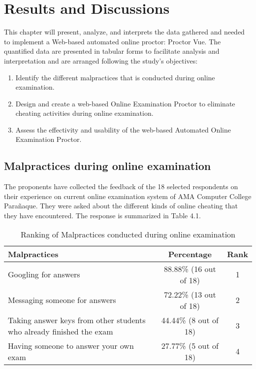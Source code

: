 \chapter{Results and Discussions}

This chapter will present, analyze, and interprets the data gathered and needed to implement a Web-based automated online proctor: Proctor Vue.
The quantified data are presented in tabular forms to facilitate analysis and interpretation and are arranged following the study’s objectives:

\begin{enumerate}
   \item Identify the different malpractices that is conducted during online examination.
   \item Design and create a web-based Online Examination Proctor to eliminate cheating activities during online examination.
   \item Assess the effectivity and usability of the web-based Automated Online Examination Proctor.
\end{enumerate}

\section{Malpractices during online examination}

The proponents have collected the feedback of the 18 selected respondents on their experience on current online examination system of AMA Computer College Parañaque.
They were asked about the different kinds of online cheating that they have encountered.
The response is summarized in Table 4.1.

\pagebreak

\begin{table}[h!]
   \begin{center}
      \begin{tabular}{|m{20em}|c|c|}
         \hline
         \textbf{Malpractices}                                                & \textbf{Percentage}    & \textbf{Rank} \\
         \hline
         Googling for answers                                                 & 88.88\% (16 out of 18) & 1             \\
         \hline
         Messaging someone for answers                                        & 72.22\% (13 out of 18) & 2             \\
         \hline
         Taking answer keys from other students who already finished the exam & 44.44\% (8 out of 18)  & 3             \\
         \hline
         Having someone to answer your own exam                               & 27.77\% (5 out of 18)  & 4             \\
         \hline
      \end{tabular}
   \end{center}
   \caption{Ranking of Malpractices conducted during online examination}
\end{table}

